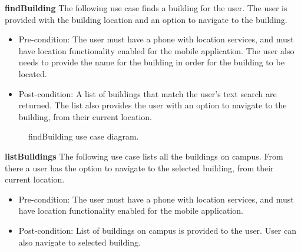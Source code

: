 \documentclass[12pt,a4paper]{article}
\begin{document}
			\textbf{findBuilding}
			The following use case finds a building for the user. The user is provided with the building location and an 					option to navigate to the building.

			\begin{itemize}
			\item Pre-condition: The user must have a phone with location services, and must have location functionality 						  enabled for the mobile application. The user also needs to provide the name for the building in order for 					  the building to be located.
			\item Post-condition: A list of buildings that match the user's text search are returned. The list also provides   				  the user with an option to navigate to the building, from their current location.
			\end{itemize}

			\begin{figure}[ht!]
				\caption \newline findBuilding use case diagram.
			\end{figure}

			\textbf{listBuildings}
			The following use case lists all the buildings on campus. From there a user has the option to navigate to the 					selected building, from their current location.

			\begin{itemize}
			\item Pre-condition: The user must have a phone with location services, and must have location functionality 						  enabled for the mobile application.
			\item Post-condition: List of buildings on campus is provided to the user. User can also navigate to selected   					  building.
			\end{itemize}
\end{document}
